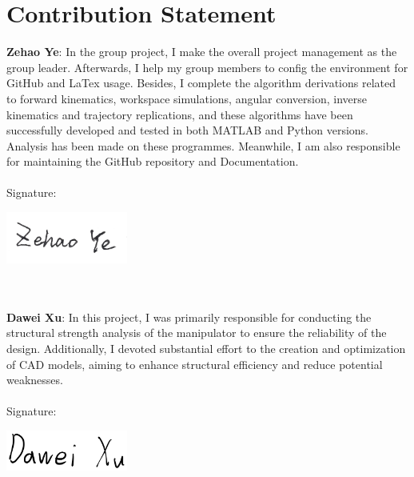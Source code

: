 \chapter{Contribution Statement}
\noindent \textbf{Zehao Ye}: In the group project, I make the overall project management as the group leader. Afterwards, I 
help my group members to config the environment for GitHub and LaTex usage. Besides, I complete the algorithm derivations 
related to forward kinematics, workspace simulations, angular conversion, inverse kinematics and trajectory replications, 
and these algorithms have been successfully developed and tested in both MATLAB and Python versions. Analysis has been made on these programmes. 
Meanwhile, I am also responsible for maintaining the GitHub repository and Documentation. \\
\qquad \\
\hspace*{\fill} Signature: \hrulefill
\vspace{-18mm}
\begin{center}
    \hspace{100mm}
    \includegraphics[width=4cm]{Image/Signature/yezh.png} 
\end{center}
\qquad \\
\qquad \\
\noindent \textbf{Dawei Xu}: In this project, I was primarily responsible for conducting the structural strength analysis of the 
manipulator to ensure the reliability of the design. Additionally, I devoted substantial effort to the creation and optimization 
of CAD models, aiming to enhance structural efficiency and reduce potential weaknesses.  \\
\qquad \\
\hspace*{\fill} Signature: \hrulefill
\vspace{-17mm}
\begin{center}
    \hspace{100mm}
    \includegraphics[width=4cm]{Image/Signature/xudw.png} 
\end{center}
\qquad \\
